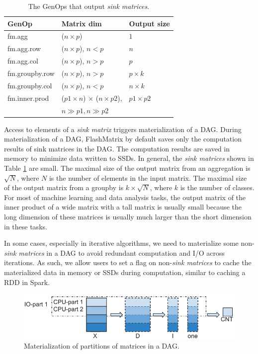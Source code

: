 \begin{table}
\begin{center}
\footnotesize
\begin{tabular}{|l|l|l|}
\hline
GenOp & Matrix dim & Output size \\
\hline
fm.agg & ($n \times p$) & $1$ \\
\hline
fm.agg.row & ($n \times p$), $n < p$ & $n$ \\
\hline
fm.agg.col & ($n \times p$), $n > p$ & $p$ \\
\hline
fm.groupby.row & ($n \times p$), $n > p$ & $p \times k$ \\
\hline
fm.groupby.col & ($n \times p$), $n < p$ & $n \times k$ \\
\hline
fm.inner.prod & ($p1 \times n$) $\times$ ($n \times p2$), & $p1 \times p2$ \\
			  & $n \gg p1, n \gg p2$ &  \\
\hline
\end{tabular}
\normalsize
\end{center}
\caption{The GenOps that output \textit{sink matrices}.}
\label{tbl:sink}
\end{table}

Access to elements of a \textit{sink matrix} triggers materialization of a DAG.
During materialization of a DAG, FlashMatrix by default saves only the computation
results of sink matrices in the DAG. The computation results are saved in memory
to minimize data written to SSDs. In general, the \textit{sink matrices} shown
in Table \ref{tbl:sink} are small. The maximal size of the output matrix from
an aggregation is $\sqrt{N}$, where $N$ is the number of elements in the input
matrix. The maximal size of the output matrix from a groupby is $k \times \sqrt{N}$,
where $k$ is the number of classes.
For most of machine learning and data analysis tasks, the output matrix of
the inner product of a wide matrix with a tall matrix is usually small because
the long dimension of these matrices is usually much larger than the short
dimension in these tasks.

In some cases, especially in iterative algorithms,
we need to materialize some non-\textit{sink matrices} in a DAG to avoid
redundant computation and I/O across iterations. As such, we allow users to
set a flag on non-\textit{sink matrices} to cache the materialized data in memory
or SSDs during computation, similar to caching a RDD in Spark.

\begin{figure}
	\centering
	\includegraphics[scale=0.6]{FlashMatrix_figs/materialize.pdf}
	\caption{Materialization of partitions of matrices in a DAG.}
	\label{fig:mater}
\end{figure}

